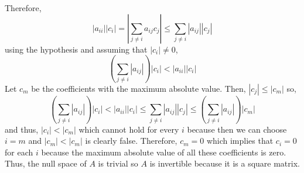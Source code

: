 \documentclass[12pt]{extarticle}
\begin{document}
\begin{enumerate}
\begin{enumerate}
Therefore, 
\[|a_{ii}| |c_i| = \left| \sum_{j \neq i} a_{ij} c_j \right| \le \sum_{j \neq i} |a_{ij}| |c_j| \]
using the hypothesis and assuming that $|c_i| \neq 0$,
\[\left( \sum_{j \neq i} |a_{ij}| \right) |c_i| < |a_{ii}| |c_i|  \]
Let $c_m$ be the coefficients with the maximum absolute value. Then, $|c_j| \le |c_m|$ so, 
\[\left( \sum_{j \neq i} |a_{ij}| \right) |c_i| < |a_{ii}| |c_i| \le \sum_{j \neq i} |a_{ij}| |c_j| \le \left( \sum_{j \neq i} |a_{ij}| \right) |c_m|  \]
and thus, $|c_i| < |c_m|$ which cannot hold for every $i$ because then we can choose $i = m$ and $|c_m| < |c_m|$ is clearly false. Therefore, $c_m = 0$ which implies that $c_i = 0$ for each $i$ because the maximum absolute value of all these coefficients is zero. Thus, the null space of $A$ is trivial so $A$ is invertible because it is a square matrix.  


\end{enumerate}
\end{enumerate}
\end{document}
